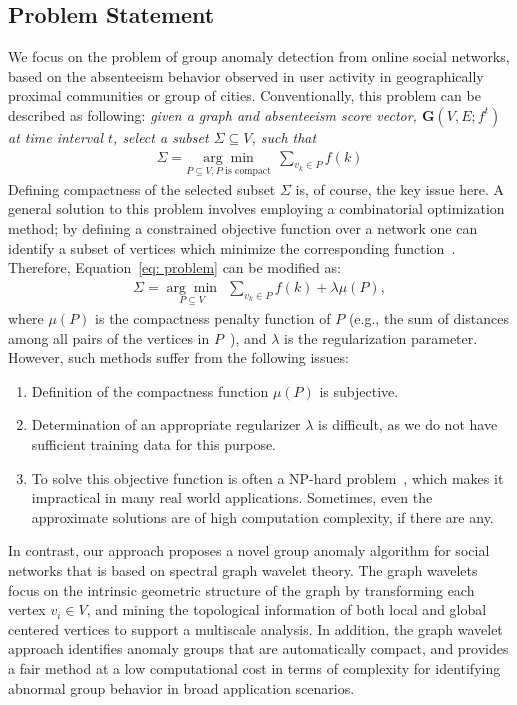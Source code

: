 \subsection{Problem Statement}
\label{sec:problemformulation}
We focus on the problem of group anomaly detection from online social networks, based on the absenteeism behavior observed in user activity in geographically proximal communities or group of cities.
Conventionally, this problem can be described as following: \emph{given a graph and \textit{absenteeism score} vector, $\mathbf{G}(V,E;f^t)$ at time interval $t$, select a subset $\Sigma \subseteq V$, such that
\begin{eqnarray}
 \label{eq: problem}
    \Sigma=\underset{P\subseteq V, P \mbox{ is compact}}{\arg\min}\ \ \sum_{v_k\in P} {f(k)}
\end{eqnarray} }
Defining compactness of the selected subset $\Sigma$ is, of course, the key issue here.
A general solution to this problem involves employing a combinatorial optimization method; by defining a constrained objective function over a network one can identify a subset of vertices which minimize the corresponding function~\cite{rozenshtein2014event}. Therefore, Equation~\ref{eq: problem} can be modified as:
\begin{eqnarray}
 \label{eq: problem_conventional}
    \Sigma=\underset{P\subseteq V}{\arg\min}\ \ \sum_{v_k\in P} {f(k)}+\lambda \mu(P),
\end{eqnarray}
where $\mu(P)$ is the compactness penalty function of $P$ (e.g., the sum of distances among
all pairs of the vertices in $P$~\cite{rozenshtein2014event}), and $\lambda$ is the regularization parameter.
However, such methods suffer from the following issues:
\begin{enumerate}
\item Definition of the compactness function $\mu(P)$ is subjective.
\item  Determination of an appropriate regularizer $\lambda$ is difficult, as we do not have sufficient training data for this purpose.
\item To solve this objective function is often a NP-hard problem~\cite{rozenshtein2014event}, which makes it impractical in many real world applications. Sometimes, even the approximate solutions are of high computation complexity, if there are any.
\end{enumerate}

In contrast, our approach proposes a novel group anomaly algorithm for social networks that is based on spectral graph wavelet theory.
The graph wavelets focus on the intrinsic geometric structure of the graph by transforming each vertex $v_i\in V$, and mining the topological information of both local and global centered vertices to support a multiscale analysis. In addition, the graph wavelet approach identifies anomaly groups that are automatically compact, and provides a fair method at a low computational cost in terms of complexity for identifying abnormal group behavior in broad application scenarios.


